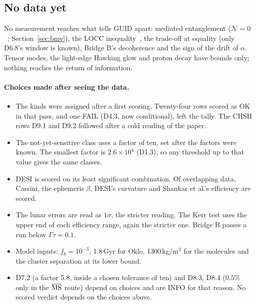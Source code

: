 \subsection{No data yet}\label{sec:data-nodata}

No measurement reaches what tells GUID apart: mediated entanglement ($\mathcal N=0$~\cite{bose,mv}; Section~\ref{sec:bmv}), the LOCC
inequality~\cite{lpp}, the trade-off at equality (only D6.8's window is known), Bridge B's decoherence and the sign of the drift of $\alpha$.
Tensor modes, the light-edge Hawking glow and proton decay have bounds only; nothing reaches the return of information.

\paragraph{Choices made after seeing the data.}
\begin{itemize}[nosep,leftmargin=*]
\item The kinds were assigned after a first scoring. Twenty-four rows scored as OK in that pass, and one FAIL (D4.3, now conditional), left
the tally. The CHSH rows D9.1 and D9.2 followed after a cold reading of the paper.
\item The not-yet-sensitive class uses a factor of ten, set after the factors were known. The smallest factor is $2.6\times10^4$ (D1.3), so any
threshold up to that value gives the same classes.
\item DESI is scored on its least significant combination. Of overlapping data, Cassini, the ephemeris $\beta$, DESI's curvature and Shankar
et al.'s efficiency are scored.
\item The lunar errors are read as $1\sigma$, the stricter reading. The Kerr test uses the upper end of each efficiency range, again the
stricter one. Bridge B passes a run below $\Gamma\tau=0.1$.
\item Model inputs: $f_b=10^{-3}$, 1.8\,Gyr for Oklo, 1300\,kg/m$^3$ for the molecules and the cluster separation at its lower bound.
\item D7.2 (a factor 5.8, inside a chosen tolerance of ten) and D8.3, D8.4 ($0.5\%$ only in the $\overline{\rm MS}$ route) depend on choices
and are INFO for that reason. No scored verdict depends on the choices above.
\end{itemize}

